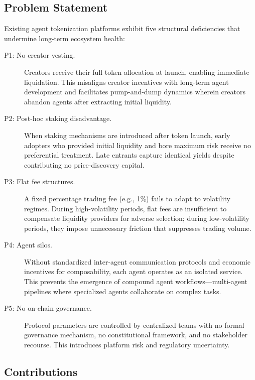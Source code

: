 \subsection{Problem Statement}
\label{subsec:problem}

Existing agent tokenization platforms exhibit five structural deficiencies that
undermine long-term ecosystem health:

\begin{description}
  \item[P1: No creator vesting.] Creators receive their full token allocation at
    launch, enabling immediate liquidation. This misaligns creator incentives
    with long-term agent development and facilitates pump-and-dump dynamics
    wherein creators abandon agents after extracting initial liquidity.

  \item[P2: Post-hoc staking disadvantage.] When staking mechanisms are
    introduced after token launch, early adopters who provided initial liquidity
    and bore maximum risk receive no preferential treatment. Late entrants
    capture identical yields despite contributing no price-discovery capital.

  \item[P3: Flat fee structures.] A fixed percentage trading fee (e.g., 1\%)
    fails to adapt to volatility regimes. During high-volatility periods, flat
    fees are insufficient to compensate liquidity providers for adverse
    selection; during low-volatility periods, they impose unnecessary friction
    that suppresses trading volume.

  \item[P4: Agent silos.] Without standardized inter-agent communication
    protocols and economic incentives for composability, each agent operates as
    an isolated service. This prevents the emergence of compound agent
    workflows---multi-agent pipelines where specialized agents collaborate on
    complex tasks.

  \item[P5: No on-chain governance.] Protocol parameters are controlled by
    centralized teams with no formal governance mechanism, no constitutional
    framework, and no stakeholder recourse. This introduces platform risk and
    regulatory uncertainty.
\end{description}

\subsection{Contributions}
\label{subsec:contributions}

